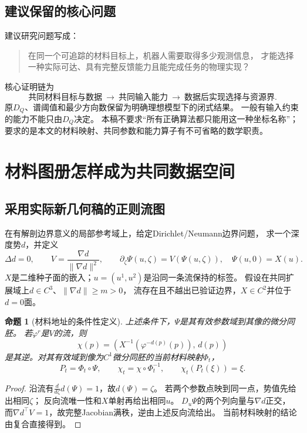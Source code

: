 \documentclass[11pt,a4paper]{article}
\numberwithin{equation}{section}
\newtheorem{proposition}[theorem]{命题}
\theoremstyle{definition}
\begin{document}
\subsection{建议保留的核心问题}
建议研究问题写成：
\begin{quote}
在同一个可追踪的材料目标上，机器人需要取得多少观测信息，
才能选择一种实际可达、具有完整反馈能力且能完成任务的物理实现？
\end{quote}
核心证明链为
\[
\boxed{\text{共同材料目标与数据}}
\ \longrightarrow\
\boxed{\text{共同输入能力}}
\ \longrightarrow\
\boxed{\text{数据后实现选择与资源界}}.
\]
原$D_Q$、谱阈值和最少方向数保留为明确理想模型下的闭式结果。
一般有输入约束的能力不能只由$D_Q$决定。
本稿不要求“所有正确算法都只能用这一种坐标名称”；
要求的是本文的材料映射、共同参数和能力算子有不可省略的数学职责。

\section{材料图册怎样成为共同数据空间}
\subsection{采用实际新几何稿的正则流图}
在有解剖边界意义的局部参考域上，给定Dirichlet/Neumann边界问题，
求一个深度势$d$，并定义
\begin{equation}
 \Delta d=0,\qquad
 V=\frac{\nabla d}{\|\nabla d\|^2},\qquad
 \partial_\zeta\Psi(u,\zeta)=V(\Psi(u,\zeta)),\quad
 \Psi(u,0)=X(u).
 \label{eq:flow}
\end{equation}
$X$是二维种子面的嵌入；$u=(u^1,u^2)$是沿同一条流保持的标签。
假设在共同扩展域上$d\in C^3$、$\|\nabla d\|\ge m>0$，
流存在且不越出已验证边界，$X\in C^2$并位于$d=0$面。

\begin{proposition}[材料地址的条件性定义]
上述条件下，$\Psi$是其有效参数域到其像的微分同胚。
若$\varphi^r$是$V$的流，则
\[
 \chi(p)=\left(X^{-1}(\varphi^{-d(p)}(p)),\,d(p)\right)
\]
是其逆。对其有效域到像为$C^1$微分同胚的当前材料映射$\Phi_t$，
\[
 P_t=\Phi_t\circ\Psi,\qquad
 \chi_t=\chi\circ\Phi_t^{-1},\qquad
 \chi_t(P_t(\xi))=\xi.
\]
\end{proposition}
\begin{proof}
沿流有$\frac{d}{d\zeta}d(\Psi)=1$，故$d(\Psi)=\zeta$。
若两个参数点映到同一点，势值先给出相同$\zeta$；
反向流唯一性和$X$单射再给出相同$u$。
$D_u\Psi$的两个列向量与$\nabla d$正交，
而$\nabla d^\top V=1$，故完整Jacobian满秩，逆由上述反向流给出。
当前材料映射的结论由复合直接得到。
\end{proof}
\end{document}
